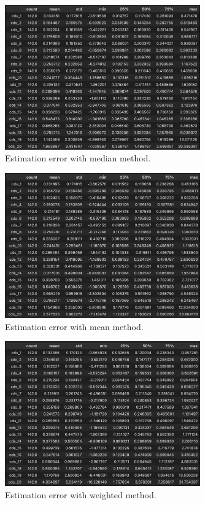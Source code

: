 \documentclass{article}
\begin{document}
\begin{figure}[H]
    \centering
    \includegraphics[width=0.75\textwidth]{../assets/Return difference_median method.png}
    \caption{\label{fig:myplot}Estimation error with median method.}
    \end{figure}          

\begin{figure}[H]
    \centering
    \includegraphics[width=0.75\textwidth]{../assets/Return difference_mean method.png}
    \caption{\label{fig:myplot}Estimation error with mean method.}
    \end{figure}   

\begin{figure}[H]
    \centering
    \includegraphics[width=0.75\textwidth]{../assets/Return difference_weighted method.png}
    \caption{\label{fig:myplot}Estimation error with weighted method.}
    \end{figure} 
\end{document}
